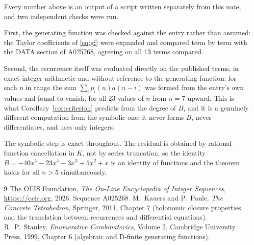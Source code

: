 \documentclass[11pt,a4paper]{article}
\theoremstyle{plain}
\theoremstyle{definition}
\begin{document}
Every number above is an output of a script written separately from this note, and two
independent checks were run.

First, the generating function was checked against the entry rather than assumed: the
Taylor coefficients of \eqref{eq:gf} were expanded and compared term by term with the DATA
section of A025268, agreeing on all 13 terms compared.

Second, the recurrence itself was evaluated directly on the published terms, in exact
integer arithmetic and without reference to the generating function: for each $n$ in range
the sum $\sum_{i}p_{i}(n)a(n-i)$ was formed from the entry's own values and found to
vanish, for all 23 values of $n$ from $n=7$ upward. This is what
Corollary~\ref{cor:criterion} predicts from the degree of $B$, and it is a genuinely
different computation from the symbolic one: it never forms $B$, never differentiates, and
uses only integers.

The symbolic step is exact throughout. The residual is obtained by rational-function
cancellation in $K$, not by series truncation, so the identity $B=- 40 x^{5} - 23 x^{4} - 3 x^{3} + 5 x^{2} + x$ is an
identity of functions and the theorem holds for all $n>5$ simultaneously.

\begin{thebibliography}{9}
 The OEIS Foundation, \emph{The On-Line Encyclopedia of Integer Sequences},
\url{https://oeis.org}, 2026. Sequence A025268.
 M.~Kauers and P.~Paule, \emph{The Concrete Tetrahedron}, Springer, 2011,
Chapter 7 (holonomic closure properties and the translation between recurrences and
differential equations).
 R.~P.~Stanley, \emph{Enumerative Combinatorics}, Volume 2, Cambridge
University Press, 1999, Chapter 6 (algebraic and D-finite generating functions).
\end{thebibliography}
\end{document}
